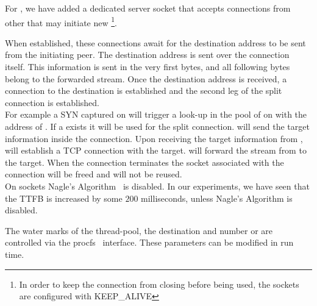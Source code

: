 For \reconn, we have added a dedicated server socket that accepts connections from other \relays that may initiate new \reconn \footnote{In order to keep the connection from closing before being used, the sockets are configured with KEEP\_ALIVE}.

When established, these connections await for the destination address to be sent from the initiating peer. The destination address is sent over the connection itself. This information is sent in the very first bytes, and all following bytes belong to the forwarded stream. 
Once the destination address is received, a connection to the destination is established and the second leg of the split connection is established.\\ 
For example a SYN captured on \rc will trigger a look-up in the pool of \reconn on \rc with the address of \rs. If a \reconn exists it will be used for the split connection. \rc will send the target information inside the connection. Upon receiving the target information from \rc, \rs will establish a TCP connection with the target. \rs will forward the stream from \rc to the target. When the connection terminates the socket associated with the connection will be freed and will not be reused.\\ 
 On \reconn sockets Nagle's Algorithm~\cite{nagle} is disabled. In our experiments, we have seen that the TTFB is increased by some $200$ milliseconds, unless Nagle's Algorithm is disabled.  

 The water marks of the thread-pool, the destination and number or \reconn are controlled via the procfs~\cite{proc} interface. These parameters can be modified in run time.


